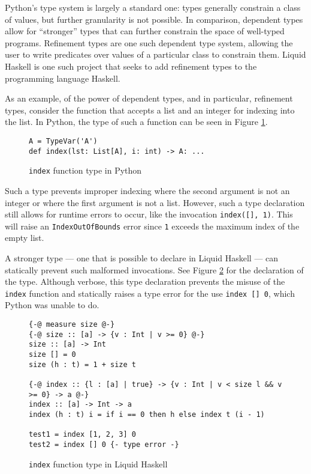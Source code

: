 \documentclass{book}
\begin{document}
Python's type system is largely a standard one: types generally constrain a class of values, but further granularity is not possible. In comparison, dependent types allow for ``stronger'' types that can further constrain the space of well-typed programs. Refinement types are one such dependent type system, allowing the user to write predicates over values of a particular class to constrain them. Liquid Haskell is one such project that seeks to add refinement types to the programming language Haskell.

As an example, of the power of dependent types, and in particular, refinement types, consider the function that accepts a list and an integer for indexing into the list. In Python, the type of such a function can be seen in Figure \ref{python-type-indexing}.

\begin{figure}
\centering
\begin{verbatim}
A = TypeVar('A')
def index(lst: List[A], i: int) -> A: ... \end{verbatim}
\caption{\texttt{index} function type in Python}
\label{python-type-indexing}
\end{figure}
Such a type prevents improper indexing where the second argument is not an integer or where the first argument is not a list. However, such a type declaration still allows for runtime errors to occur, like the invocation \texttt{index([], 1)}. This will raise an \texttt{IndexOutOfBounds} error since \texttt{1} exceeds the maximum index of the empty list.

A stronger type --- one that is possible to declare in Liquid Haskell --- can statically prevent such malformed invocations. See Figure \ref{lh-type-indexing} for the declaration of the type. Although verbose, this type declaration prevents the misuse of the \texttt{index} function and statically raises a type error for the use \texttt{index [] 0}, which Python was unable to do.

\begin{figure}
    \centering
    \begin{verbatim}
{-@ measure size @-}
{-@ size :: [a] -> {v : Int | v >= 0} @-}
size :: [a] -> Int
size [] = 0
size (h : t) = 1 + size t

{-@ index :: {l : [a] | true} -> {v : Int | v < size l && v >= 0} -> a @-}
index :: [a] -> Int -> a
index (h : t) i = if i == 0 then h else index t (i - 1)

test1 = index [1, 2, 3] 0
test2 = index [] 0 {- type error -}\end{verbatim}
    \caption{\texttt{index} function type in Liquid Haskell}
    \label{lh-type-indexing}
\end{figure}
\end{document}
